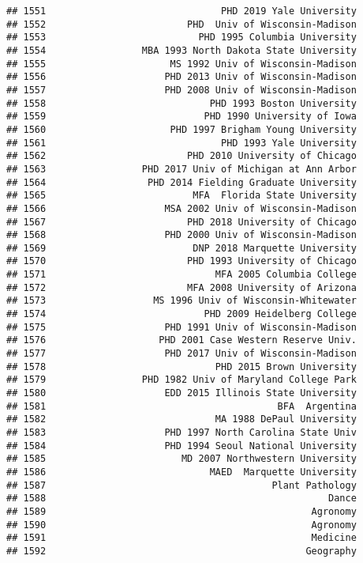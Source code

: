 \documentclass[
]{article}
\begin{document}
\begin{verbatim}
## 1551                               PHD 2019 Yale University
## 1552                         PHD  Univ of Wisconsin-Madison
## 1553                           PHD 1995 Columbia University
## 1554                 MBA 1993 North Dakota State University
## 1555                      MS 1992 Univ of Wisconsin-Madison
## 1556                     PHD 2013 Univ of Wisconsin-Madison
## 1557                     PHD 2008 Univ of Wisconsin-Madison
## 1558                             PHD 1993 Boston University
## 1559                            PHD 1990 University of Iowa
## 1560                      PHD 1997 Brigham Young University
## 1561                               PHD 1993 Yale University
## 1562                         PHD 2010 University of Chicago
## 1563                 PHD 2017 Univ of Michigan at Ann Arbor
## 1564                  PHD 2014 Fielding Graduate University
## 1565                          MFA  Florida State University
## 1566                     MSA 2002 Univ of Wisconsin-Madison
## 1567                         PHD 2018 University of Chicago
## 1568                     PHD 2000 Univ of Wisconsin-Madison
## 1569                          DNP 2018 Marquette University
## 1570                         PHD 1993 University of Chicago
## 1571                              MFA 2005 Columbia College
## 1572                         MFA 2008 University of Arizona
## 1573                   MS 1996 Univ of Wisconsin-Whitewater
## 1574                            PHD 2009 Heidelberg College
## 1575                     PHD 1991 Univ of Wisconsin-Madison
## 1576                    PHD 2001 Case Western Reserve Univ.
## 1577                     PHD 2017 Univ of Wisconsin-Madison
## 1578                              PHD 2015 Brown University
## 1579                 PHD 1982 Univ of Maryland College Park
## 1580                     EDD 2015 Illinois State University
## 1581                                         BFA  Argentina
## 1582                              MA 1988 DePaul University
## 1583                     PHD 1997 North Carolina State Univ
## 1584                     PHD 1994 Seoul National University
## 1585                        MD 2007 Northwestern University
## 1586                             MAED  Marquette University
## 1587                                        Plant Pathology
## 1588                                                  Dance
## 1589                                               Agronomy
## 1590                                               Agronomy
## 1591                                               Medicine
## 1592                                              Geography

\end{verbatim}
\end{document}
